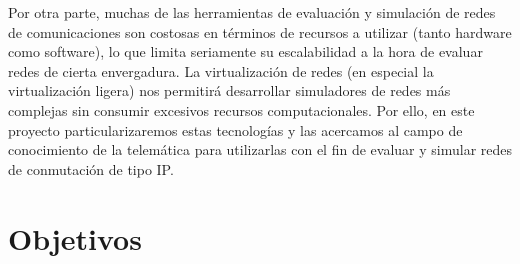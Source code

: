 \documentclass[a4paper, oneside, 12pt]{book}
\begin{document}
	 \noindent Por otra parte, muchas de las herramientas de evaluación y simulación de redes de comunicaciones son costosas en términos de recursos a utilizar (tanto hardware como software), lo que limita seriamente su escalabilidad a la hora de evaluar redes de cierta envergadura. La virtualización de redes (en especial la virtualización ligera) nos permitirá desarrollar simuladores de redes más complejas sin consumir excesivos recursos computacionales. Por ello, en este proyecto  particularizaremos estas tecnologías y las acercamos al campo de conocimiento de la telemática para utilizarlas con el fin de evaluar y simular redes de conmutación de tipo IP. \\
	
	
	
	
	\section{Objetivos}
	
\end{document}
